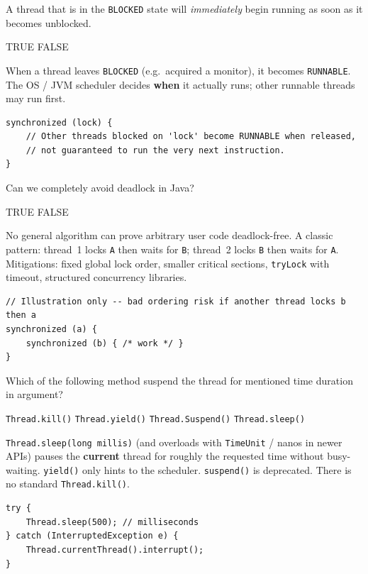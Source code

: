 \question[4]
A thread that is in the \texttt{BLOCKED} state will \emph{immediately} begin running as soon as it becomes unblocked.
\begin{choices}
  \choice TRUE
  \CorrectChoice FALSE
\end{choices}
\begin{solution}
  When a thread leaves \texttt{BLOCKED} (e.g.\ acquired a monitor), it becomes \texttt{RUNNABLE}. The OS / JVM scheduler decides \textbf{when} it actually runs; other runnable threads may run first.

\begin{lstlisting}[style=java]
synchronized (lock) {
    // Other threads blocked on 'lock' become RUNNABLE when released,
    // not guaranteed to run the very next instruction.
}
\end{lstlisting}
\end{solution}

\question[4]
Can we completely avoid deadlock in Java?
\begin{choices}
  \choice TRUE
  \CorrectChoice FALSE
\end{choices}
\begin{solution}
  No general algorithm can prove arbitrary user code deadlock-free. A classic pattern: thread~1 locks \texttt{A} then waits for \texttt{B}; thread~2 locks \texttt{B} then waits for \texttt{A}. Mitigations: fixed global lock order, smaller critical sections, \texttt{tryLock} with timeout, structured concurrency libraries.

\begin{lstlisting}[style=java]
// Illustration only -- bad ordering risk if another thread locks b then a
synchronized (a) {
    synchronized (b) { /* work */ }
}
\end{lstlisting}
\end{solution}

\question[4]
Which of the following method suspend the thread for mentioned time duration in argument?
\begin{choices}
  \choice \texttt{Thread.kill()}
  \choice \texttt{Thread.yield()}
  \choice \texttt{Thread.Suspend()}
  \CorrectChoice \texttt{Thread.sleep()}
\end{choices}
\begin{solution}
  \texttt{Thread.sleep(long millis)} (and overloads with \texttt{TimeUnit} / nanos in newer APIs) pauses the \textbf{current} thread for roughly the requested time without busy-waiting. \texttt{yield()} only hints to the scheduler. \texttt{suspend()} is deprecated. There is no standard \texttt{Thread.kill()}.

\begin{lstlisting}[style=java]
try {
    Thread.sleep(500); // milliseconds
} catch (InterruptedException e) {
    Thread.currentThread().interrupt();
}
\end{lstlisting}
\end{solution}

